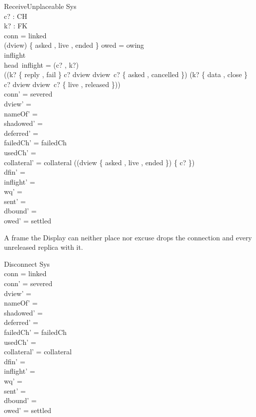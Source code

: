 \documentclass[a4paper,10pt,fleqn]{article}
\begin{document}
\begin{schema}{ReceiveUnplaceable}
  \Delta Sys \\
  c? : CH \\
  k? : FK \\
\where
  conn = linked \\
  (\ran dview) \cap \{ asked , live , ended \} \neq \emptyset \lor owed = owing \\
  inflight \neq \langle \rangle \\
  head~inflight = (c? , k?) \\
  \lnot ((k? \in \{ reply , fail \} \land c? \in \dom dview \land dview~c? \in \{ asked , cancelled \}) \lor (k? \in \{ data , close \} \land c? \in \dom dview \land dview~c? \in \{ live , released \})) \\
  conn' = severed \\
  dview' = \emptyset \\
  nameOf' = \emptyset \\
  shadowed' = \emptyset \\
  deferred' = \emptyset \\
  failedCh' = failedCh \\
  usedCh' = \emptyset \\
  collateral' = collateral \cup (\dom (dview \rres \{ asked , live , ended \}) \setminus \{ c? \}) \\
  dfin' = \emptyset \\
  inflight' = \langle \rangle \\
  wq' = \langle \rangle \\
  sent' = \langle \rangle \\
  dbound' = \emptyset \\
  owed' = settled
\end{schema}

A frame the Display can neither place nor excuse drops the connection and every unreleased replica with it.

\begin{schema}{Disconnect}
  \Delta Sys \\
\where
  conn = linked \\
  conn' = severed \\
  dview' = \emptyset \\
  nameOf' = \emptyset \\
  shadowed' = \emptyset \\
  deferred' = \emptyset \\
  failedCh' = failedCh \\
  usedCh' = \emptyset \\
  collateral' = collateral \\
  dfin' = \emptyset \\
  inflight' = \langle \rangle \\
  wq' = \langle \rangle \\
  sent' = \langle \rangle \\
  dbound' = \emptyset \\
  owed' = settled
\end{schema}
\end{document}
